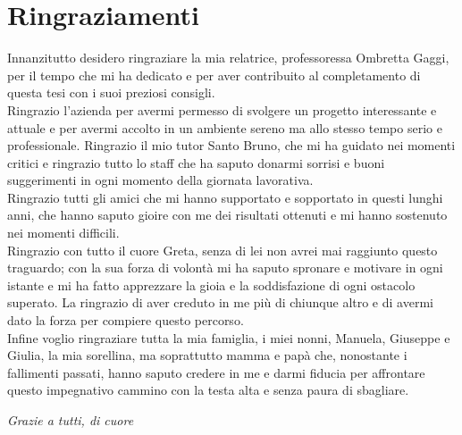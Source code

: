 
\bigskip

\begingroup
\let\clearpage\relax
\let\cleardoublepage\relax
\let\cleardoublepage\relax
\chapter*{Ringraziamenti}
Innanzitutto desidero ringraziare la mia relatrice, professoressa Ombretta Gaggi, per il tempo che mi ha dedicato e per aver contribuito al completamento di questa tesi con i suoi preziosi consigli.\\

Ringrazio l'azienda \myCompany per avermi permesso di svolgere un progetto interessante e attuale e per avermi accolto in un ambiente sereno ma allo stesso tempo serio e professionale.
Ringrazio il mio tutor Santo Bruno, che mi ha guidato nei momenti critici e ringrazio tutto lo staff che ha saputo donarmi sorrisi e buoni suggerimenti in ogni momento della giornata lavorativa.\\

Ringrazio tutti gli amici che mi hanno supportato e sopportato in questi lunghi anni, che hanno saputo gioire con me dei risultati ottenuti e mi hanno sostenuto nei momenti difficili.\\

Ringrazio con tutto il cuore Greta, senza di lei non avrei mai raggiunto questo traguardo; con la sua forza di volontà mi ha saputo spronare e motivare in ogni istante e mi ha fatto apprezzare la gioia e la soddisfazione di ogni ostacolo superato. La ringrazio di aver creduto in me più di chiunque altro e di avermi dato la forza per compiere questo percorso.\\

Infine voglio ringraziare tutta la mia famiglia, i miei nonni, Manuela, Giuseppe e Giulia, la mia sorellina, ma soprattutto mamma e papà che, nonostante i fallimenti passati, hanno saputo credere in me e darmi fiducia per affrontare questo impegnativo cammino con la testa alta e senza paura di sbagliare.

\vspace{2cm}

\begin{center}
\emph{Grazie a tutti, di cuore}
\end{center}

\endgroup



